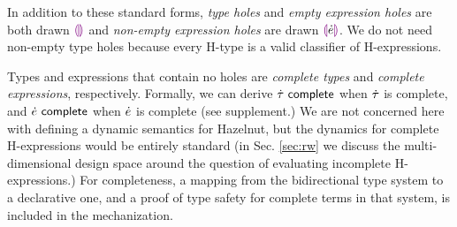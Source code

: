 In addition to these standard forms, \emph{type holes} and \emph{empty
  expression holes} are both drawn $\textcolor{violet}{\llparenthesis}\textcolor{violet}{\rrparenthesis}$ and \emph{non-empty expression
  holes} are drawn $\textcolor{violet}{\llparenthesis}\dot{e}\textcolor{violet}{\rrparenthesis}$. We do not need non-empty type holes
because every H-type is a valid classifier of H-expressions.

Types and expressions that contain no holes are \emph{complete types} and
\emph{complete expressions}, respectively. Formally, we can derive
$\dot{\tau}~\mathsf{complete}$ when $\dot{\tau}$ is complete, and $\dot{e}~\mathsf{complete}$ when
$\dot{e}$ is complete (see supplement.) We are not concerned here with
defining a dynamic semantics for Hazelnut, but the dynamics for complete
H-expressions would be entirely standard (in Sec. \ref{sec:rw} we discuss
the multi-dimensional design space around the question of evaluating
incomplete H-expressions.) For completeness, a mapping from the
bidirectional type system to a declarative one, and a proof of type safety
for complete terms in that system, is included in the mechanization.

